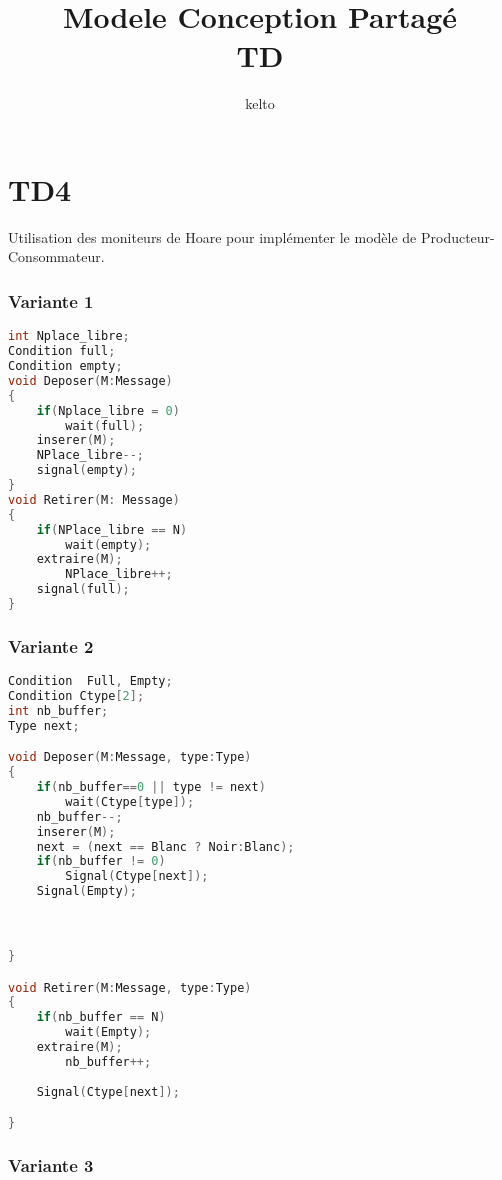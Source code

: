 \documentclass[10pt,a4paper]{article}
\title{Modele Conception Partagé\\TD}
\date{}
\author{kelto}
\begin{document}
\maketitle

\part*{TD4}

Utilisation des moniteurs de Hoare pour implémenter le modèle de Producteur-Consommateur.

\section*{Variante 1}
\begin{lstlisting}[language=C, caption=Corps moniteur Prod\_Cons]
int Nplace_libre;
Condition full;
Condition empty;
void Deposer(M:Message)
{
	if(Nplace_libre = 0)
		wait(full);
	inserer(M);
	NPlace_libre--;
	signal(empty);
}
void Retirer(M: Message)
{
	if(NPlace_libre == N)
		wait(empty);
	extraire(M);
		NPlace_libre++;
	signal(full);
}
\end{lstlisting}

\newpage

\section*{Variante 2}

\begin{lstlisting}[language=C, caption=Corps moniteur Prod\_Cons]
Condition  Full, Empty;
Condition Ctype[2];
int nb_buffer;
Type next;

void Deposer(M:Message, type:Type)
{
	if(nb_buffer==0 || type != next)
		wait(Ctype[type]);
	nb_buffer--;
	inserer(M);
	next = (next == Blanc ? Noir:Blanc);
	if(nb_buffer != 0)
		Signal(Ctype[next]);
	Signal(Empty);



}

void Retirer(M:Message, type:Type)
{
	if(nb_buffer == N)
		wait(Empty);
	extraire(M);
		nb_buffer++;
	
	Signal(Ctype[next]);

}
\end{lstlisting}

\newpage
\section*{Variante 3}
\end{document}
